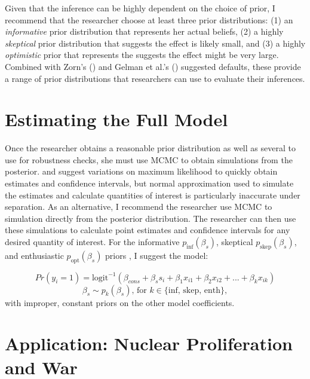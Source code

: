 \documentclass[12pt]{article}
\begin{document}
Given that the inference can be highly dependent on the choice of prior, I recommend that the researcher choose at least three prior distributions: (1) an \emph{informative} prior distribution that represents her actual beliefs, (2) a highly \emph{skeptical} prior distribution that suggests the effect is likely small, and (3) a highly \emph{optimistic} prior that represents the suggests the effect might be very large. Combined with Zorn's (\citeyear{Zorn2005}) and Gelman et al.'s (\citeyear{Gelmanetal2008}) suggested defaults, these provide a range of prior distributions that researchers can use to evaluate their inferences.

\section*{Estimating the Full Model}

Once the researcher obtains a reasonable prior distribution as well as several to use for robustness checks, she must use MCMC to obtain simulations from the posterior. \citeyear{Zorn2005} and \cite{Gelmanetal2008} suggest variations on maximum likelihood to quickly obtain estimates and confidence intervals, but normal approximation used to simulate the estimates and calculate quantities of interest \citep{KingTomzWittenberg2000} is particularly inaccurate under separation. As an alternative, I recommend the researcher use MCMC to simulation directly from the posterior distribution. The researcher can then use these simulations to calculate point estimates and confidence intervals for any desired quantity of interest. For the informative $p_{\text{inf}}(\beta_s)$, skeptical $p_{\text{skep}}(\beta_s)$, and enthusiastic $p_{\text{opt}}(\beta_s)$ priors , I suggest the model:

\begin{equation*}
Pr(y_i =1) = \text{logit}^{-1}(\beta_{cons} + \beta_s s_i +  \beta_1 x_{i1} + \beta_2 x_{i2} + ... + \beta_k x_{ik})
\end{equation*}
\begin{equation*}
\beta_s \sim  p_k(\beta_s) \text{, for } k \in \{\text{inf, skep, enth}\},
\end{equation*}
with improper, constant priors on the other model coefficients.

\section*{Application: Nuclear Proliferation and War}
\end{document}
